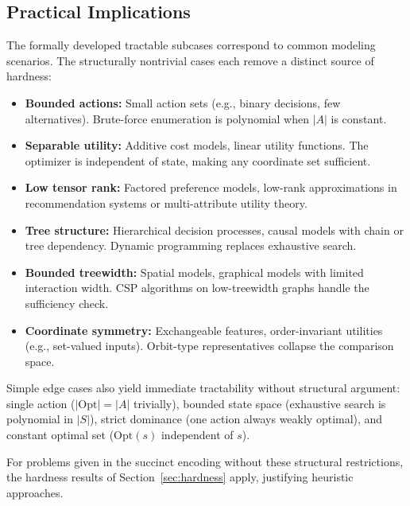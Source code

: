\subsection{Practical Implications}\label{sec:tract-practical}

The formally developed tractable subcases correspond to common modeling scenarios. The structurally nontrivial cases each remove a distinct source of hardness:

\begin{itemize}
\item \textbf{Bounded actions:} Small action sets (e.g., binary decisions, few alternatives). Brute-force enumeration is polynomial when $|A|$ is constant.
\item \textbf{Separable utility:} Additive cost models, linear utility functions. The optimizer is independent of state, making any coordinate set sufficient.
\item \textbf{Low tensor rank:} Factored preference models, low-rank approximations in recommendation systems or multi-attribute utility theory.
\item \textbf{Tree structure:} Hierarchical decision processes, causal models with chain or tree dependency. Dynamic programming replaces exhaustive search.
\item \textbf{Bounded treewidth:} Spatial models, graphical models with limited interaction width. CSP algorithms on low-treewidth graphs handle the sufficiency check.
\item \textbf{Coordinate symmetry:} Exchangeable features, order-invariant utilities (e.g., set-valued inputs). Orbit-type representatives collapse the comparison space.
\end{itemize}

Simple edge cases also yield immediate tractability without structural argument: single action ($|\mathrm{Opt}| = |A|$ trivially), bounded state space (exhaustive search is polynomial in $|S|$), strict dominance (one action always weakly optimal), and constant optimal set ($\mathrm{Opt}(s)$ independent of $s$).

For problems given in the succinct encoding without these structural restrictions, the hardness results of Section~\ref{sec:hardness} apply, justifying heuristic approaches.
